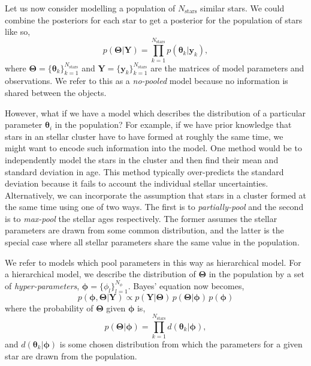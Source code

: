 Let us now consider modelling a population of $N_\mathrm{stars}$ similar stars. We could combine the posteriors for each star to get a posterior for the population of stars like so,
%
\begin{equation}
    p(\bm{\Theta}|\bm{Y}) = \prod_{k=1}^{N_\mathrm{stars}} p(\bm{\theta}_k|\bm{y}_k),
\end{equation}
%
where $\bm{\Theta} = \{\bm{\theta}_k\}_{k=1}^{N_\mathrm{stars}}$ and $\bm{Y} = \{\bm{y}_k\}_{k=1}^{N_\mathrm{stars}}$ are the matrices of model parameters and observations. We refer to this as a \emph{no-pooled} model because no information is shared between the objects. 

However, what if we have a model which describes the distribution of a particular parameter $\bm{\theta}_i$ in the population? For example, if we have prior knowledge that stars in an stellar cluster have to have formed at roughly the same time, we might want to encode such information into the model. One method would be to independently model the stars in the cluster and then find their mean and standard deviation in age. This method typically over-predicts the standard deviation because it fails to account the individual stellar uncertainties. Alternatively, we can incorporate the assumption that stars in a cluster formed at the same time using one of two ways. The first is to \emph{partially-pool} and the second is to \emph{max-pool} the stellar ages respectively. The former assumes the stellar parameters are drawn from some common distribution, and the latter is the special case where all stellar parameters share the same value in the population.

We refer to models which pool parameters in this way as hierarchical model. For a hierarchical model, we describe the distribution of $\bm{\Theta}$ in the population by a set of \emph{hyper-parameters}, $\bm{\phi} = \{ \phi_l \}_{l=1}^{N_\phi}$. Bayes' equation now becomes,
%
\begin{equation}
    p(\bm{\phi}, \bm{\Theta} | \bm{Y}) \propto p(\bm{Y} | \bm{\Theta}) \, p(\bm{\Theta} | \bm{\phi}) \, p(\bm{\phi})
\end{equation}
%
where the probability of $\bm{\Theta}$ given $\bm{\phi}$ is,
%
\begin{equation}
    p(\bm{\Theta} | \bm{\phi}) = \prod_{k=1}^{N_\mathrm{stars}} d(\bm{\theta}_k | \bm{\phi}),
\end{equation}
%
and $d(\bm{\theta}_k | \bm{\phi})$ is some chosen distribution from which the parameters for a given star are drawn from the population.

